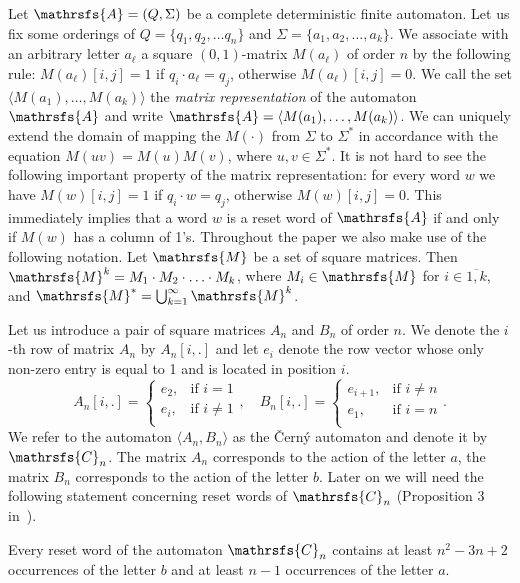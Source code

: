 \documentclass[11pt]{llncs}
\newcommand{\A}{\mathrsfs{A}}
\newcommand{\C}{\mathrsfs{C}}
\begin{document}
Let $\A = (Q, \Sigma)$ be a complete deterministic finite automaton. Let us fix some orderings of $Q = \{q_1, q_2, \ldots q_n\}$ and
$\Sigma = \{a_1, a_2, \ldots, a_k\}$. We associate with an arbitrary letter $a_\ell$ a square $(0,1)$-matrix $M(a_\ell)$ of order $n$ by
the following rule: $M(a_\ell)[i,j] = 1$ if $q_i\cdot a_{\ell} = q_j$, otherwise $M(a_\ell)[i,j] = 0$. We call the set $\langle M(a_1),
\ldots, M(a_{k})\rangle$ the \emph{matrix representation} of the automaton $\A$ and write $\A = \langle M(a_1), \ldots, M(a_{k})\rangle$.
We can uniquely extend the domain of mapping the $M(\cdot )$ from $\Sigma$ to $\Sigma^{*}$ in accordance with the equation $M(uv) =
M(u)M(v)$, where $u,v \in \Sigma^*$. It is not hard to see the following important property of the matrix representation: for every word
$w$ we have $M(w)[i,j] = 1$ if $q_i \cdot w = q_j$, otherwise $M(w)[i,j] = 0$. This immediately implies that a word $w$ is a reset word of
$\A$ if and only if $M(w)$ has a column of 1's. Throughout the paper we also make use of the following notation. Let $\mathrsfs{M}$ be a
set of square matrices. Then $\mathrsfs{M}^{k} = M_1 \cdot M_2 \cdot \ldots \cdot M_k$, where $M_i \in \mathrsfs{M}$ for $i \in
\overline{1,k}$, and $\mathrsfs{M}^* = \bigcup_{k = 1}^{\infty} \mathrsfs{M}^k$.

Let us introduce a pair of square matrices $A_n$ and $B_n$ of order $n$. We denote the $i$-th row of matrix $A_n$ by $A_n[i,.]$ and let
$e_i$ denote the row vector whose only non-zero entry is equal to 1 and is located in position $i$.
$$ A_n[i,.] =
\begin{cases}
e_2, &\text{if } i = 1\\
e_i, &\text{if } i \neq 1\\
\end{cases},\quad
B_n[i,.] =
\begin{cases}
e_{i+1}, &\text{if } i \neq n\\
e_1, &\text{if } i = n\\
\end{cases}.
$$
We refer to the automaton $\langle A_n, B_n \rangle$ as the \v{C}ern\'{y} automaton and denote it by $\C_n$. The matrix $A_n$ corresponds
to the action of the letter $a$, the matrix $B_n$ corresponds to the action of the letter $b$. Later on we will need the following
statement concerning reset words of $\C_n$ (Proposition 3 in~\cite{Gu}).

\begin{proposition}
\label{th:cerny} Every reset word of the automaton $\mathrsfs{C}_n$ contains at least $n^2 - 3n + 2$ occurrences of the letter $b$ and at
least $n - 1$ occurrences of the letter $a$.
\end{proposition}
\end{document}
